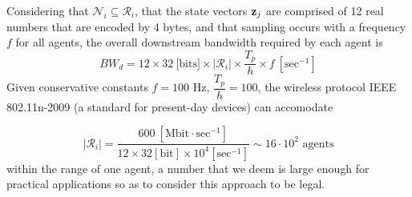 Considering that $\mathcal{N}_i \subseteq \mathcal{R}_i$, that the state
vectors $\bm{\mathbf{z}}_j$ are comprised of 12 real numbers that are encoded by
4 bytes, and that sampling occurs with a frequency $f$ for all agents, the
overall downstream bandwidth required by each agent is
$$BW_d = 12 \times 32\ \text{[bits]} \times |\mathcal{R}_i| \times \dfrac{T_p}{h} \times f\ [\text{sec}^{-1}]$$
Given conservative constants $f = 100$ Hz, $\dfrac{T_p}{h} = 100$, the
wireless protocol IEEE 802.11n-2009 (a standard for present-day devices)
can accomodate

$$|\mathcal{R}_i| = \dfrac{600\ [\text{Mbit}\cdot \text{sec}^{-1}] }{12\times32[\text{bit}]\times10^4 [\text{sec}^{-1}]} \sim
16 \cdot 10^2 \text{ agents}$$ within the range of one agent, a number that we
deem is large enough for practical applications so as to consider this
approach to be legal.
